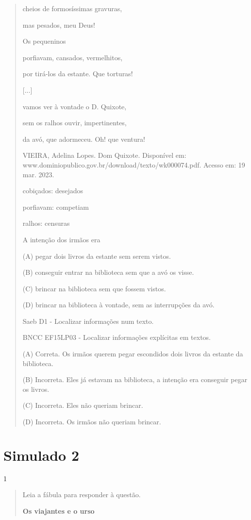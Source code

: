 \begin{escolha}
\begin{escolha}
{\begin{quote}
cheios de formosíssimas gravuras,

mas pesados, meu Deus!

Os pequeninos

porfiavam, cansados, vermelhitos,

por tirá-los da estante. Que torturas!

{[}...{]}

vamos ver à vontade o D. Quixote,

sem os ralhos ouvir, impertinentes,

da avó, que adormeceu. Oh! que ventura!

VIEIRA, Adelina Lopes. Dom Quixote. Disponível em:
www.dominiopublico.gov.br/download/texto/wk000074.pdf. Acesso em: 19
mar. 2023.

cobiçados: desejados

porfiavam: competiam

ralhos: censuras

A intenção dos irmãos era

(A) pegar dois livros da estante sem serem vistos.

(B) conseguir entrar na biblioteca sem que a avó os visse.

(C) brincar na biblioteca sem que fossem vistos.

(D) brincar na biblioteca à vontade, sem as interrupções da avó.

Saeb D1 - Localizar informações num texto.

BNCC EF15LP03 - Localizar informações explícitas em textos.

(A) Correta. Os irmãos querem pegar escondidos dois livros da estante da
biblioteca.

(B) Incorreta. Eles já estavam na biblioteca, a intenção era conseguir
pegar os livros.

(C) Incorreta. Eles não queriam brincar.

(D) Incorreta. Os irmãos não queriam brincar.
\end{quote}

\chapter{Simulado 2}

\num{1}

\begin{quote}
Leia a fábula para responder à questão.

\textbf{Os viajantes e o urso}


\end{quote}}
\end{escolha}
\end{escolha}
